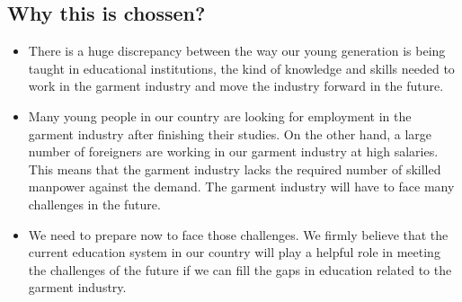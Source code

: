 \documentclass{article}
\begin{document}
\subsection{Why this is chossen?}
\begin{itemize}
\item There is a huge discrepancy between the way our young generation is being
taught in educational institutions, the kind of knowledge and skills needed to
work in the garment industry and move the industry forward in the future.
\item Many young people in our country are looking for
employment in the garment industry after finishing their studies. On the other
hand, a large number of foreigners are working in our garment industry at high
salaries. This means that the garment industry lacks the required number of
skilled manpower against the demand. The garment industry will have to face
many challenges in the future.
\item We need to prepare now to face those challenges.
We firmly believe that the current education system in our country will play
a helpful role in meeting the challenges of the future if we can fill the gaps in
education related to the garment industry.
   
\end{itemize}
\end{document}

